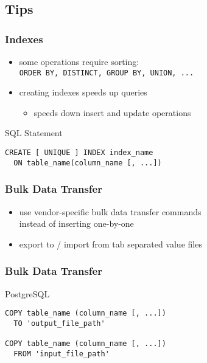 \documentclass[dvipsnames]{beamer}
\theoremstyle{plain}
\begin{document}
\subsection{Tips}

\begin{frame}[fragile]
  \frametitle{Indexes}

  \begin{itemize}
    \item some operations require sorting:\\
      \lstinline!ORDER BY, DISTINCT, GROUP BY, UNION, ...!

    \pause
    \item creating indexes speeds up queries
    \begin{itemize}
      \item speeds down insert and update operations
    \end{itemize}
  \end{itemize}

  \pause
  \begin{block}{SQL Statement}
    \begin{lstlisting}[language=ExtendedSQL]
CREATE [ UNIQUE ] INDEX index_name
  ON table_name(column_name [, ...])
    \end{lstlisting}
  \end{block}
\end{frame}

\begin{frame}[fragile]
  \frametitle{Bulk Data Transfer}

  \begin{itemize}
    \item use vendor-specific bulk data transfer commands\\
      instead of inserting one-by-one

    \item export to / import from tab separated value files
  \end{itemize}
\end{frame}

\begin{frame}[fragile]
  \frametitle{Bulk Data Transfer}

  \begin{block}{PostgreSQL}
    \begin{lstlisting}
COPY table_name (column_name [, ...])
  TO 'output_file_path'

COPY table_name (column_name [, ...])
  FROM 'input_file_path'
    \end{lstlisting}
  \end{block}
\end{frame}
\end{document}
